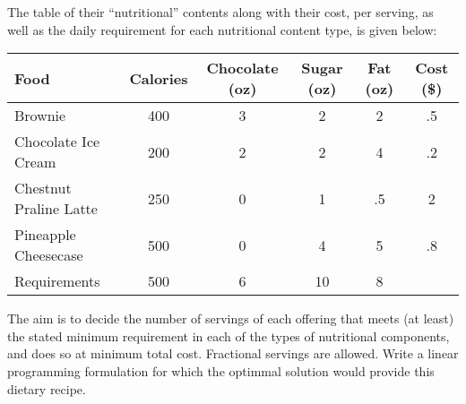 \documentclass[twoside]{article}%
\begin{document}
The table of their ``nutritional'' contents along with their cost, per serving, as well as the daily requirement for each nutritional content type, is given below:
\begin{center}
\begin{tabular}{|l|cccc|c|}
Food & Calories & Chocolate (oz) & Sugar (oz) & Fat (oz) & Cost (\$) \\
\hline
Brownie & 400 & 3 & 2 & 2 & .5 \\
Chocolate Ice Cream & 200 & 2 & 2 & 4 & .2 \\
Chestnut Praline Latte & 250 & 0 & 1 & .5 & 2 \\ 
Pineapple Cheesecase & 500 & 0 & 4 & 5 & .8 \\
\hline 
Requirements & 500 & 6 & 10 & 8 & \\
\hline
\end{tabular}
\end{center}
The aim is to decide the number of servings of each offering that meets (at least) the stated minimum requirement in each of the types of nutritional components, and does so at minimum total cost. Fractional servings are allowed. Write a linear programming formulation for which the optimmal solution would provide this dietary recipe.
\end{document}
